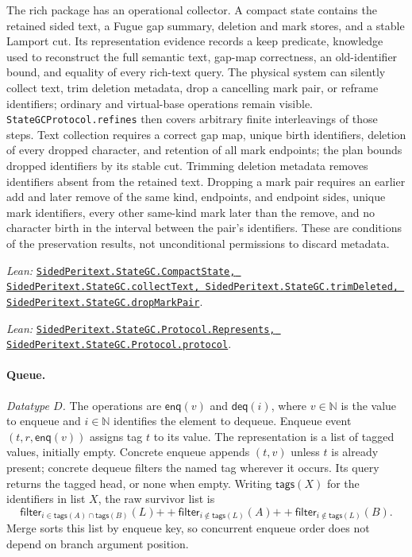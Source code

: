 \documentclass[11pt]{article}
\theoremstyle{definition}
\newcommand{\N}{\mathbb N}
\newcommand{\lean}[1]{\texttt{#1}}
\newcommand{\src}[2]{\href{../../#1}{\texttt{#2}}}
\newcommand{\anchor}[2]{\par\smallskip\noindent\emph{Lean: }\src{#1}{#2}.}
\begin{document}
The rich package has an operational collector.  A compact state contains the
retained sided text, a Fugue gap summary, deletion and mark stores, and a
stable Lamport cut.  Its representation evidence records a keep predicate,
knowledge used to reconstruct the full semantic text, gap-map correctness,
an old-identifier bound, and equality of every rich-text query.  The physical
system can silently collect text, trim deletion metadata, drop a cancelling
mark pair, or reframe identifiers; ordinary and virtual-base operations remain
visible.  \lean{StateGCProtocol.refines} then covers arbitrary finite
interleavings of those steps.
Text collection requires a correct gap map, unique birth identifiers,
deletion of every dropped character, and retention of all mark endpoints;
the plan bounds dropped identifiers by its stable cut. Trimming deletion
metadata removes identifiers absent from the retained text. Dropping a mark
pair requires an earlier add and later remove of the same kind, endpoints,
and endpoint sides, unique mark identifiers, every other same-kind mark
later than the remove, and no character birth in the interval between the
pair's identifiers. These are conditions of the preservation results, not
unconditional permissions to discard metadata.
\anchor{Sal/MRDTs/Instances/SidedPeritextStateGC.lean}
  {SidedPeritext.StateGC.CompactState, SidedPeritext.StateGC.collectText,
   SidedPeritext.StateGC.trimDeleted, SidedPeritext.StateGC.dropMarkPair}
\anchor{Sal/MRDTs/Instances/SidedPeritextProtocol.lean}
  {SidedPeritext.StateGC.Protocol.\allowbreak Represents,
   SidedPeritext.StateGC.Protocol.\allowbreak protocol}

\paragraph{Queue.}

\emph{Datatype $D$.} The operations are $\mathsf{enq}(v)$ and $\mathsf{deq}(i)$, where $v\in\N$
is the value to enqueue and $i\in\N$ identifies the element to dequeue.
Enqueue event $(t,r,\mathsf{enq}(v))$ assigns tag $t$ to its value.
The representation is a list of tagged values, initially empty. Concrete
enqueue appends $(t,v)$ unless $t$ is already present; concrete dequeue filters
the named tag wherever it occurs. Its query returns the tagged head, or none when empty. Writing $\mathsf{tags}(X)$ for
the identifiers in list $X$, the raw survivor list is
\[
 \mathsf{filter}_{i\in\mathsf{tags}(A)\cap\mathsf{tags}(B)}(L)
 {+\!+}\mathsf{filter}_{i\notin\mathsf{tags}(L)}(A)
 {+\!+}\mathsf{filter}_{i\notin\mathsf{tags}(L)}(B).
\]
Merge sorts this list by enqueue key, so concurrent enqueue order
does not depend on branch argument position.
\end{document}

